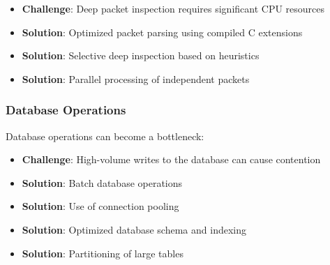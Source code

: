 \begin{itemize}
    \item \textbf{Challenge}: Deep packet inspection requires significant CPU resources
    \item \textbf{Solution}: Optimized packet parsing using compiled C extensions
    \item \textbf{Solution}: Selective deep inspection based on heuristics
    \item \textbf{Solution}: Parallel processing of independent packets
\end{itemize}

\subsubsection{Database Operations}
Database operations can become a bottleneck:

\begin{itemize}
    \item \textbf{Challenge}: High-volume writes to the database can cause contention
    \item \textbf{Solution}: Batch database operations
    \item \textbf{Solution}: Use of connection pooling
    \item \textbf{Solution}: Optimized database schema and indexing
    \item \textbf{Solution}: Partitioning of large tables
\end{itemize}

